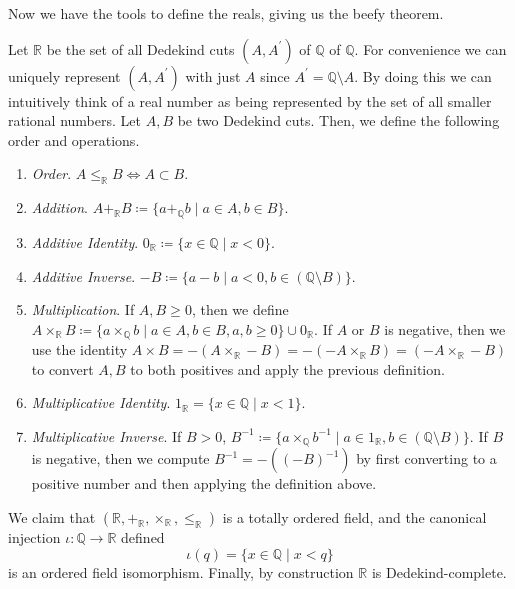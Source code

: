 \documentclass{article}
\begin{document}
      Now we have the tools to define the reals, giving us the beefy theorem. 

      \begin{theorem}
        Let $\mathbb{R}$ be the set of all Dedekind cuts $(A, A^\prime)$ of $\mathbb{Q}$ of $\mathbb{Q}$. For convenience we can uniquely represent $(A, A^\prime)$ with just $A$ since $A^\prime = \mathbb{Q} \setminus A$. By doing this we can intuitively think of a real number as being represented by the set of all smaller rational numbers. Let $A, B$ be two Dedekind cuts. Then, we define the following order and operations. 
        \begin{enumerate}
          \item \textit{Order}. $A \leq_{\mathbb{R}} B \iff A \subset B$. 
          \item \textit{Addition}. $A +_{\mathbb{R}} B \coloneqq \{ a +_{\mathbb{Q}} b \mid a \in A, b \in B \}$. 
          \item \textit{Additive Identity}. $0_{\mathbb{R}} \coloneqq \{x \in \mathbb{Q} \mid x < 0 \}$. 
          \item \textit{Additive Inverse}. $-B \coloneqq \{ a - b \mid a < 0 , b \in (\mathbb{Q} \setminus B) \}$.
          \item \textit{Multiplication}. If $A, B \geq 0$, then we define $A \times_{\mathbb{R}} B \coloneqq \{ a \times_{\mathbb{Q}} b \mid a \in A, b \in B, a, b \geq 0\} \cup 0_{\mathbb{R}}$. If $A$ or $B$ is negative, then we use the identity $A \times B = -(A \times_{\mathbb{R}} -B) = -(-A \times_{\mathbb{R}} B) = (-A \times_{\mathbb{R}} -B)$ to convert $A, B$ to both positives and apply the previous definition. 
          \item \textit{Multiplicative Identity}. $1_{\mathbb{R}} = \{x \in \mathbb{Q} \mid x < 1 \}$. 
          \item \textit{Multiplicative Inverse}. If $B > 0$, $B^{-1} \coloneqq \{ a \times_{\mathbb{Q}} b^{-1} \mid a \in 1_{\mathbb{R}}, b \in (\mathbb{Q} \setminus B) \}$. If $B$ is negative, then we compute $B^{-1} = -((-B)^{-1})$ by first converting to a positive number and then applying the definition above. 
        \end{enumerate}
        We claim that $(\mathbb{R}, +_{\mathbb{R}}, \times_{\mathbb{R}}, \leq_{\mathbb{R}})$ is a totally ordered field, and the canonical injection $\iota: \mathbb{Q} \rightarrow \mathbb{R}$ defined 
        \begin{equation}
          \iota(q) = \{x \in \mathbb{Q} \mid x < q \}
        \end{equation}
        is an ordered field isomorphism. Finally, by construction $\mathbb{R}$ is Dedekind-complete. 
      \end{theorem} 
\end{document}
